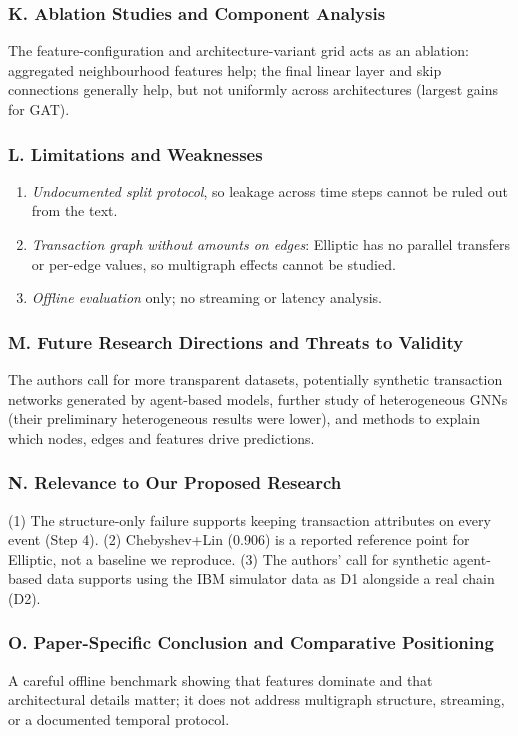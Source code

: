 \documentclass[11pt,a4paper]{article}
\begin{document}
\subsubsection*{K. Ablation Studies and Component Analysis}
The feature-configuration and architecture-variant grid acts as an ablation: aggregated neighbourhood features help; the final linear layer and skip connections generally help, but not uniformly across architectures (largest gains for GAT).

\subsubsection*{L. Limitations and Weaknesses}
\begin{enumerate}[leftmargin=*]
    \item \textit{Undocumented split protocol}, so leakage across time steps cannot be ruled out from the text.
    \item \textit{Transaction graph without amounts on edges}: Elliptic has no parallel transfers or per-edge values, so multigraph effects cannot be studied.
    \item \textit{Offline evaluation} only; no streaming or latency analysis.
\end{enumerate}

\subsubsection*{M. Future Research Directions and Threats to Validity}
The authors call for more transparent datasets, potentially synthetic transaction networks generated by agent-based models, further study of heterogeneous GNNs (their preliminary heterogeneous results were lower), and methods to explain which nodes, edges and features drive predictions.

\subsubsection*{N. Relevance to Our Proposed Research}
(1) The structure-only failure supports keeping transaction attributes on every event (Step 4). (2) Chebyshev+Lin (0.906) is a reported reference point for Elliptic, not a baseline we reproduce. (3) The authors' call for synthetic agent-based data supports using the IBM simulator data \cite{altman2023ibmaml} as D1 alongside a real chain (D2).

\subsubsection*{O. Paper-Specific Conclusion and Comparative Positioning}
A careful offline benchmark showing that features dominate and that architectural details matter; it does not address multigraph structure, streaming, or a documented temporal protocol.
\end{document}
